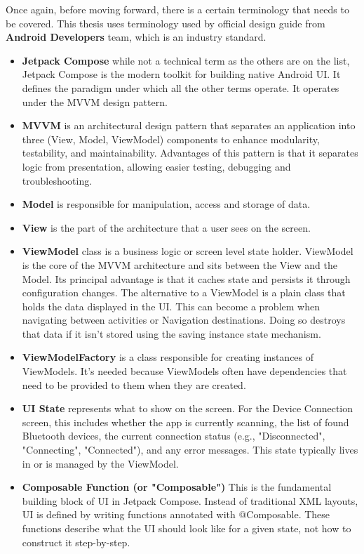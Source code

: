 Once again, before moving forward, there is a certain terminology that needs to be covered. This thesis uses terminology used by official design guide\cite{android_ui_layer} from \textbf{Android Developers} team, which is an industry standard.
\begin{itemize}
	\item \textbf{Jetpack Compose} while not a technical term as the others are on the list, Jetpack Compose is the modern toolkit for building native Android \ac{UI}. It defines the paradigm under which all the other terms operate. It operates under the \ac{MVVM} design pattern.
	\item \textbf{\ac{MVVM}} is an architectural design pattern that separates an application into three (View, Model, ViewModel) components to enhance modularity, testability, and maintainability. Advantages of this pattern is that it separates logic from presentation, allowing easier testing, debugging and troubleshooting\cite{García2023}.
	\item \textbf{Model} is responsible for manipulation, access and storage of data.
	\item \textbf{View} is the part of the architecture that a user sees on the screen. 
	\item \textbf{ViewModel} class is a business logic or screen level state holder. ViewModel is the core of the \ac{MVVM} architecture and sits between the View and the Model. Its principal advantage is that it caches state and persists it through configuration changes. The alternative to a ViewModel is a plain class that holds the data displayed in the \ac{UI}. This can become a problem when navigating between activities or Navigation destinations. Doing so destroys that data if it isn't stored using the saving instance state mechanism. 
	\item \textbf{ViewModelFactory} is a class responsible for creating instances of ViewModels. It's needed because ViewModels often have dependencies that need to be provided to them when they are created.
	\item \textbf{UI State} represents what to show on the screen. For the Device Connection screen, this includes whether the app is currently scanning, the list of found Bluetooth devices, the current connection status (e.g., "Disconnected", "Connecting", "Connected"), and any error messages. This state typically lives in or is managed by the ViewModel.
	\item \textbf{Composable Function (or "Composable")} This is the fundamental building block of \ac{UI} in Jetpack Compose. Instead of traditional XML layouts, \ac{UI} is defined by writing functions annotated with @Composable. These functions describe what the \ac{UI} should look like for a given state, not how to construct it step-by-step.

\end{itemize}
